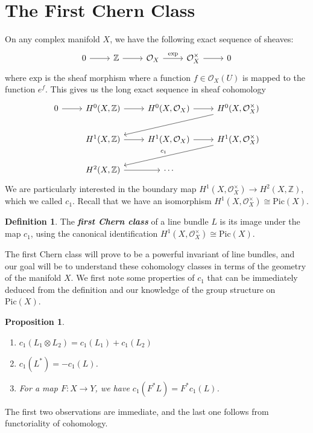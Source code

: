 \documentclass[psamsfonts, 12pt]{amsart}
\newtheorem{prop}[thm]{Proposition}
\theoremstyle{definition}
\newtheorem{defn}[thm]{Definition}
\theoremstyle{remark}
\renewcommand{\O}{\mathcal{O}}
\newcommand{\ib}[1]{\textbf{\textit{#1}}}
\newcommand{\Z}{\mathbb{Z}}
\newcommand{\enumbreak}{\ \\ \vspace{-\baselineskip}}
\begin{document}
\section{The First Chern Class}
%
On any complex manifold $X$, we have the following exact sequence of sheaves:
\[\begin{tikzcd}
0 \ar[r] & \Z \ar[r] & \O_X \ar[r, "\mathrm{exp}"] & \O_X^\times \ar[r] & 0
\end{tikzcd}\]
where $\mathrm{exp}$ is the sheaf morphism where a function $f \in \O_X(U)$ is
mapped to the function $e^f$. This gives us the long exact sequence in sheaf
cohomology
\[\begin{tikzcd}
0 \ar[r] & H^0(X, \Z) \ar[r] & H^0(X, \O_X) \ar[r] & H^0(X, \O_X^\times) \ar[dll]\\
& H^1(X, \Z) \ar[r] & H^1(X, \O_X) \ar[r] & H^1(X, \O_X^\times) \ar[dll, "c_1"']\\
& H^2(X, \Z) \ar[r] & \cdots
\end{tikzcd}\]
%
We are particularly interested in the boundary map $H^1(X,\O_X^\times) \to H^2(X, \Z)$,
which we called $c_1$. Recall that we have an isomorphism
$H^1(X,\O_X^\times) \cong \mathrm{Pic}(X)$.
%
\begin{defn}
The \ib{first Chern class} of a line bundle $L$ is its image under the map
$c_1$, using the canonical identification $H^1(X,\O_X^\times) \cong \mathrm{Pic}(X)$.
\end{defn}
%
The first Chern class will prove to be a powerful invariant of line bundles, and
our goal will be to understand these cohomology classes in terms of the geometry
of the manifold $X$. We first note some properties of $c_1$ that can be immediately
deduced from the definition and our knowledge of the group structure on $\mathrm{Pic}(X)$.
%
\begin{prop} \enumbreak
\begin{enumerate}
  \item $c_1(L_1 \otimes L_2) = c_1(L_1) + c_1(L_2)$
  \item $c_1(L^*) = -c_1(L)$.
  \item For a map $F : X \to Y$, we have $c_1(F^*L) = F^*c_1(L)$.
\end{enumerate}
\end{prop}
The first two observations are immediate, and the last one follows from functoriality
of cohomology. \\
\end{document}
